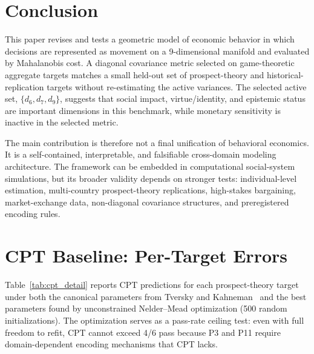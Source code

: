 \documentclass[journal]{IEEEtran}
\begin{document}
\section{Conclusion}
\label{sec:conclusion}

This paper revises and tests a geometric model of economic behavior in which decisions are represented as movement on a 9-dimensional manifold and evaluated by Mahalanobis cost.
A diagonal covariance metric selected on game-theoretic aggregate targets matches a small held-out set of prospect-theory and historical-replication targets without re-estimating the active variances.
The selected active set, $\{d_6,d_7,d_9\}$, suggests that social impact, virtue/identity, and epistemic status are important dimensions in this benchmark, while monetary sensitivity is inactive in the selected metric.

The main contribution is therefore not a final unification of behavioral economics.
It is a self-contained, interpretable, and falsifiable cross-domain modeling architecture.
The framework can be embedded in computational social-system simulations, but its broader validity depends on stronger tests: individual-level estimation, multi-country prospect-theory replications, high-stakes bargaining, market-exchange data, non-diagonal covariance structures, and preregistered encoding rules.
\appendices
\section{CPT Baseline: Per-Target Errors}
\label{app:cpt}

Table~\ref{tab:cpt_detail} reports CPT predictions for each prospect-theory target under both the canonical parameters from Tversky and Kahneman~\cite{tversky1992} and the best parameters found by unconstrained Nelder--Mead optimization (500 random initializations).
The optimization serves as a pass-rate ceiling test: even with full freedom to refit, CPT cannot exceed 4/6 pass because P3 and P11 require domain-dependent encoding mechanisms that CPT lacks.
\end{document}
